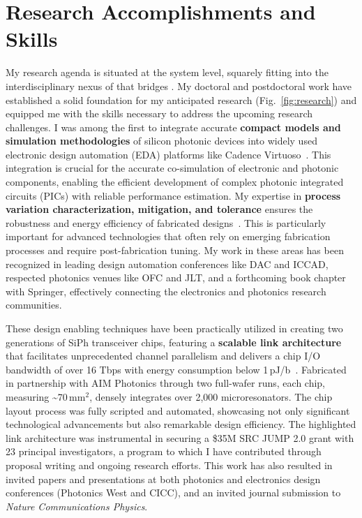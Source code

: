\section{Research Accomplishments and Skills}
My research agenda is situated at the system level, squarely fitting into the interdisciplinary nexus of \appArea{} that bridges \appCollab{}. My doctoral and postdoctoral work have established a solid foundation for my anticipated research (Fig.~\ref{fig:research}) and equipped me with the skills necessary to address the upcoming research challenges. I was among the first to integrate accurate \textbf{compact models and simulation methodologies} of silicon photonic devices into widely used electronic design automation (EDA) platforms like Cadence Virtuoso~\cite{wuCompactModelingCircuitlevel2017,zhangCompactModelingSilicon2017}. This integration is crucial for the accurate co-simulation of electronic and photonic components, enabling the efficient development of complex photonic integrated circuits (PICs) with reliable performance estimation. My expertise in \textbf{process variation characterization, mitigation, and tolerance} ensures the robustness and energy efficiency of fabricated designs~\cite{wangCharacterizationApplicationsSpatial2020,wangEnergyEfficiencyYield2021,wangDispersionEngineeredFabricationRobustSOI2023}. This is particularly important for advanced technologies that often rely on emerging fabrication processes and require post-fabrication tuning. My work in these areas has been recognized in leading design automation conferences like DAC and ICCAD, respected photonics venues like OFC and JLT, and a forthcoming book chapter with Springer, effectively connecting the electronics and photonics research communities.

These design enabling techniques have been practically utilized in creating two generations of SiPh transceiver chips, featuring a \textbf{scalable link architecture} that facilitates unprecedented channel parallelism and delivers a chip I/O bandwidth of over 16 Tbps with energy consumption below 1\,pJ/b~\cite{wangScalableArchitectureSubpJ2023,wangCICC2024}. Fabricated in partnership with AIM Photonics through two full-wafer runs, each chip, measuring \textasciitilde{}70\,mm$^\text{2}$, densely integrates over 2,000 microresonators. The chip layout process was fully scripted and automated, showcasing not only significant technological advancements but also remarkable design efficiency. The highlighted link architecture was instrumental in securing a \$35M SRC JUMP 2.0 grant with 23 principal investigators, a program to which I have contributed through proposal writing and ongoing research efforts. This work has also resulted in invited papers and presentations at both photonics and electronics design conferences (Photonics West and CICC), and an invited journal submission to \emph{Nature Communications Physics}.

